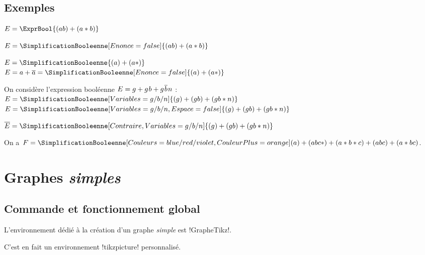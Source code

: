 \documentclass[french,a4paper,11pt]{article}
\begin{document}
{{\subsection{Exemples}

\begin{DemoCode}
$E = \ExprBool{(ab)+(a*b)}$

$E = \SimplificationBooleenne[Enonce=false]{(ab)+(a*b)}$
\end{DemoCode}

\begin{DemoCode}
$E = \SimplificationBooleenne{(a)+(a*)}$\\
$E = a + \overline{a} = \SimplificationBooleenne[Enonce=false]{(a)+(a*)}$
\end{DemoCode}

\begin{DemoCode}
On considère l'expression booléenne $E= g + g\mkern1.5mu\relax b + g\mkern1.5mu\relax\overline{b}\mkern1.5mu\relax n$ :\\
$E = \SimplificationBooleenne[Variables=g/b/n]{(g)+(gb)+(gb*n)}$\\
$E = \SimplificationBooleenne[Variables=g/b/n,Espace=false]{(g)+(gb)+(gb*n)}$
\end{DemoCode}

\begin{DemoCode}
$\overline{E} = \SimplificationBooleenne[Contraire,Variables=g/b/n]{(g)+(gb)+(gb*n)}$
\end{DemoCode}

\begin{DemoCode}
On a $F = \SimplificationBooleenne%
  [Couleurs={blue/red/violet},CouleurPlus=orange]%
  {(a)+(abc*)+(a*b*c)+(abc)+(a*bc)}$.
\end{DemoCode}

\pagebreak

\section{Graphes \textit{simples}}

\subsection{Commande et fonctionnement global}

\begin{cautionblock}
L'environnement dédié à la création d'un graphe \textit{simple} est \motcletex!GrapheTikz!.

C'est en fait un environnement \motcletex!tikzpicture! personnalisé.


\end{cautionblock}}}
\end{document}
